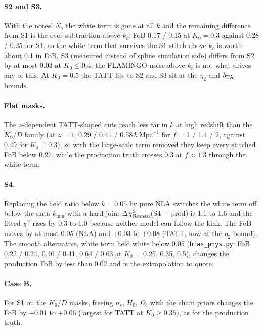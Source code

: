 \documentclass[11pt]{article}
\newcommand{\hmpc}{\,h\,\mathrm{Mpc}^{-1}}
\newcommand{\dchi}{\Delta\chi^2}
\begin{document}
\paragraph{S2 and S3.} With the notes' $N_s$ the white term is gone at all
$k$ and the remaining difference from S1 is the over-subtraction above
$k_t$: FoB 0.17 / 0.15 at $K_0 = 0.3$ against 0.28 / 0.25 for S1, so the
white term that survives the S1 stitch above $k_t$ is worth about 0.1 in
FoB. S3 (measured instead of spline simulation side) differs from S2 by at
most 0.03 at $K_0 \le 0.4$: the FLAMINGO noise above $k_t$ is not what
drives any of this. At $K_0 = 0.5$ the TATT fits to S2 and S3 sit at the
$\eta_2$ and $b_{\rm TA}$ bounds.

\paragraph{Flat masks.} The $z$-dependent TATT-shaped cuts reach less far
in $k$ at high redshift than the $K_0/D$ family (at $z = 1$, 0.29 / 0.41 /
0.58$\hmpc$ for $f$ = 1 / 1.4 / 2, against 0.49 for $K_0 = 0.3$), so with the
large-scale term removed they keep every stitched FoB below 0.27, while the
production truth crosses 0.3 at $f \approx 1.3$ through the white term.

\paragraph{S4.} Replacing the held ratio below $k = 0.05$ by pure NLA
switches the white term off below the data $k_{\min}$ with a hard join;
$\dchi_{\rm Roman}$(S4 $-$ prod) is 1.1 to 1.6 and the fitted $\chi^2$
rises by 0.3 to 1.0 because neither model can follow the kink. The FoB
moves by at most 0.05 (NLA) and +0.03 to +0.08 (TATT, now at the $\eta_2$
bound). The smooth alternative, white term held white below 0.05
(\texttt{bias\_phys.py}: FoB 0.22 / 0.24, 0.40 / 0.41, 0.64 / 0.63 at
$K_0$ = 0.25, 0.35, 0.5), changes the production FoB by less than 0.02 and
is the extrapolation to quote.

\paragraph{Case B.} For S1 on the $K_0/D$ masks, freeing $n_s$, $H_0$,
$\Omega_b$ with the chain priors changes the FoB by $-0.01$ to $+0.06$
(largest for TATT at $K_0 \ge 0.35$), as for the production truth.
\end{document}
